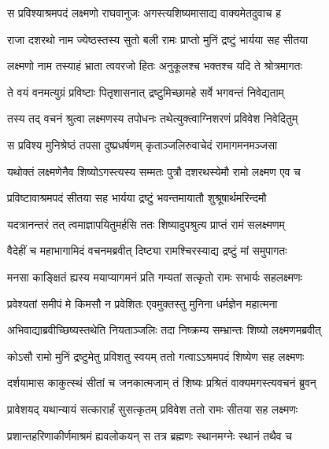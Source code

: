 
\twolineshloka
{स प्रविश्याश्रमपदं लक्ष्मणो राघवानुजः}
{अगस्त्यशिष्यमासाद्य वाक्यमेतदुवाच ह} %

\twolineshloka
{राजा दशरथो नाम ज्येष्ठस्तस्य सुतो बली}
{रामः प्राप्तो मुनिं द्रष्टुं भार्यया सह सीतया} %

\twolineshloka
{लक्ष्मणो नाम तस्याहं भ्राता त्ववरजो हितः}
{अनुकूलश्च भक्तश्च यदि ते श्रोत्रमागतः} %

\twolineshloka
{ते वयं वनमत्युग्रं प्रविष्टाः पितृशासनात्}
{द्रष्टुमिच्छामहे सर्वे भगवन्तं निवेद्यताम्} %

\twolineshloka
{तस्य तद् वचनं श्रुत्वा लक्ष्मणस्य तपोधनः}
{तथेत्युक्त्वाग्निशरणं प्रविवेश निवेदितुम्} %

\twolineshloka
{स प्रविश्य मुनिश्रेष्ठं तपसा दुष्प्रधर्षणम्}
{कृताञ्जलिरुवाचेदं रामागमनमञ्जसा} %

\twolineshloka
{यथोक्तं लक्ष्मणेनैव शिष्योऽगस्त्यस्य सम्मतः}
{पुत्रौ दशरथस्येमौ रामो लक्ष्मण एव च} %

\twolineshloka
{प्रविष्टावाश्रमपदं सीतया सह भार्यया}
{द्रष्टुं भवन्तमायातौ शुश्रूषार्थमरिन्दमौ} %

\twolineshloka
{यदत्रानन्तरं तत् त्वमाज्ञापयितुमर्हसि}
{ततः शिष्यादुपश्रुत्य प्राप्तं रामं सलक्ष्मणम्} %

\twolineshloka
{वैदेहीं च महाभागामिदं वचनमब्रवीत्}
{दिष्ट्या रामश्चिरस्याद्य द्रष्टुं मां समुपागतः} %

\twolineshloka
{मनसा काङ्क्षितं ह्यस्य मयाप्यागमनं प्रति}
{गम्यतां सत्कृतो रामः सभार्यः सहलक्ष्मणः} %

\twolineshloka
{प्रवेश्यतां समीपं मे किमसौ न प्रवेशितः}
{एवमुक्तस्तु मुनिना धर्मज्ञेन महात्मना} %

\twolineshloka
{अभिवाद्याब्रवीच्छिष्यस्तथेति नियताञ्जलिः}
{तदा निष्क्रम्य सम्भ्रान्तः शिष्यो लक्ष्मणमब्रवीत्} %

\twolineshloka
{कोऽसौ रामो मुनिं द्रष्टुमेतु प्रविशतु स्वयम्}
{ततो गत्वाऽऽश्रमपदं शिष्येण सह लक्ष्मणः} %

\twolineshloka
{दर्शयामास काकुत्स्थं सीतां च जनकात्मजाम्}
{तं शिष्यः प्रश्रितं वाक्यमगस्त्यवचनं ब्रुवन्} %

\twolineshloka
{प्रावेशयद् यथान्यायं सत्कारार्हं सुसत्कृतम्}
{प्रविवेश ततो रामः सीतया सह लक्ष्मणः} %

\twolineshloka
{प्रशान्तहरिणाकीर्णमाश्रमं ह्यवलोकयन्}
{स तत्र ब्रह्मणः स्थानमग्नेः स्थानं तथैव च} %

